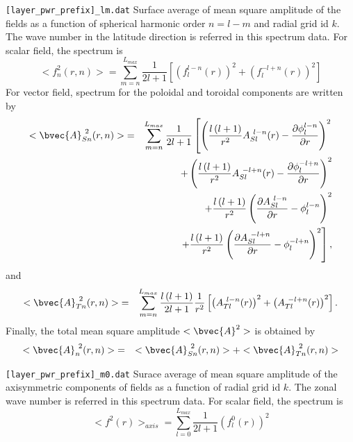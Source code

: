 \begin{description}
\item{\tt [layer\_pwr\_prefix]\_lm.dat} Surface average of mean square amplitude of the fields as a function of spherical harmonic order $n = l-m$ and radial grid id $k$. The wave number in the latitude direction is referred in this spectrum data.
For scalar field, the spectrum is
%
\begin{equation}
<f_{n}^{2}(r,n)> = \sum_{m=n}^{L_{max}} \frac{1}{2l + 1} \left[ \left(f_{l}^{l-n}(r) \right)^2 
+ \left(f_{l}^{-l+n}(r) \right)^2 \right]
\end{equation}
%
For vector field, spectrum for the poloidal and toroidal components are written by 
%
\begin{eqnarray}
<\bvec{A}_{Sn}^{\ 2}(r,n)> &=&   \sum_{m=n}^{L_{max}}\frac{1}{2l + 1}
\left[  \left(\frac{l\left(l+1 \right) }{r^{2}} A_{Sl}^{\ l-n}(r) - \frac{\partial \phi_{l}^{l-n}}{\partial r} \right)^{2} 
\right. \nonumber \\
& & + \left(\frac{l\left(l+1 \right) }{r^{2}} A_{Sl}^{\ -l+n}(r) - \frac{\partial \phi_{l}^{-l+n}}{\partial r} \right)^{2} 
\nonumber \\
& & +  \frac{l \left( l+1 \right)}{r^{2}} \left( \frac{\partial A_{Sl}^{\ l-n}}{\partial r} - \phi_{l}^{l-n} \right)^{2} 
\nonumber \\
& & \left. +  \frac{l \left( l+1 \right)}{r^{2}} \left( \frac{\partial A_{Sl}^{\ -l+n}}{\partial r} - \phi_{l}^{-l+n} \right)^{2} \right],
\end{eqnarray}
%
and
\begin{eqnarray}
<\bvec{A}_{Tn}^{\ 2}(r,n)> &=&  \sum_{m=n}^{L_{max}}\frac{l \left( l+1 \right)}{2l + 1} \frac{1}{r^{2}} 
\left[ \left( A_{Tl}^{\ l-n}(r) \right)^{2} +  \left( A_{Tl}^{\ -l+n}(r) \right)^{2} \right].
\end{eqnarray}
Finally, the total mean square amplitude $<\bvec{A}^{2}> $ is obtained by
\begin{eqnarray}
<\bvec{A}_{n}^{\ 2}(r,n)> &=& <\bvec{A}_{Sn}^{\ 2}(r,n)>  + <\bvec{A}_{Tn}^{\ 2}(r,n)> 
\end{eqnarray}
%
\item{\tt [layer\_pwr\_prefix]\_m0.dat} Surace average of mean square amplitude of the axisymmetric components of fields as a function of radial grid id $k$. The zonal wave number is referred in this spectrum data. For scalar field, the spectrum is
%
\begin{equation}
<f^{2}(r)>_{axis} = \sum_{l=0}^{L_{max}}  \frac{1}{2l + 1} \left(f_{l}^{0}(r) \right)^2
\end{equation}

\end{description}
